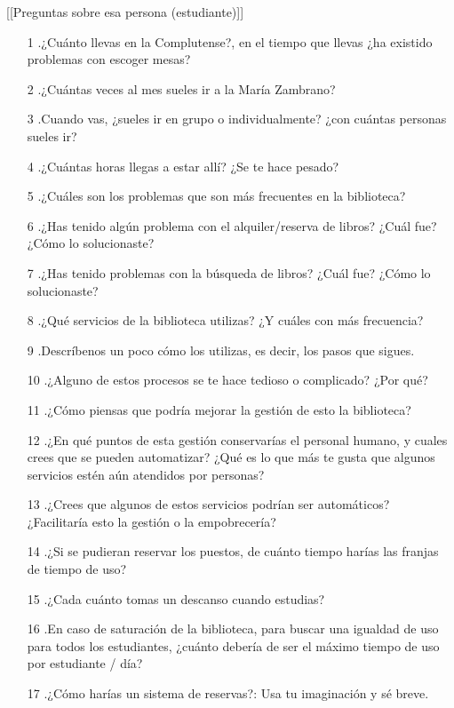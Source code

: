 \documentclass[12pt]{article}
\begin{document}
[[Preguntas sobre esa persona (estudiante)]]

\begin{itemize}
\item[1].¿Cuánto llevas en la Complutense?, en el tiempo que llevas ¿ha existido problemas con escoger mesas? 
\item[2].¿Cuántas veces al mes sueles ir a la María Zambrano? 
\item[3].Cuando vas, ¿sueles ir en grupo o individualmente? ¿con cuántas personas sueles ir? 
\item[4].¿Cuántas horas llegas a estar allí? ¿Se te hace pesado? 
\item[5].¿Cuáles son los problemas que son más frecuentes en la biblioteca? 
\item[6].¿Has tenido algún problema con el alquiler/reserva de libros? ¿Cuál fue? ¿Cómo lo solucionaste? 
\item[7].¿Has tenido problemas con la búsqueda de libros? ¿Cuál fue? ¿Cómo lo solucionaste? 
\item[8].¿Qué servicios de la biblioteca utilizas? ¿Y cuáles con más frecuencia? 
\item[9].Descríbenos un poco cómo los utilizas, es decir, los pasos que sigues. 
\item[10].¿Alguno de estos procesos se te hace tedioso o complicado? ¿Por qué? 
\item[11].¿Cómo piensas que podría mejorar la gestión de esto la biblioteca? 
\item[12].¿En qué puntos de esta gestión conservarías el personal humano, y cuales crees que se pueden automatizar? ¿Qué es lo que más te gusta que algunos servicios estén aún atendidos por personas? 
\item[13].¿Crees que algunos de estos servicios podrían ser automáticos? ¿Facilitaría esto la gestión o la empobrecería? 
\item[14].¿Si se pudieran reservar los puestos, de cuánto tiempo harías las franjas de tiempo de uso?
\item[15].¿Cada cuánto tomas un descanso cuando estudias? 
\item[16].En caso de saturación de la biblioteca, para buscar una igualdad de uso para todos los estudiantes, ¿cuánto debería de ser el máximo tiempo de uso por estudiante / día?
\item[17].¿Cómo harías un sistema de reservas?: Usa tu imaginación y sé breve.
\end{itemize}
\end{document}
